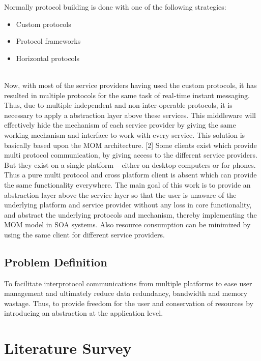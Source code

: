 \documentclass{SureshLimkar}
\begin{document}
Normally protocol building is done with one of the following strategies:
\begin{itemize}
\item Custom protocols
\item Protocol frameworks 
\item Horizontal protocols
\end{itemize}
\\
\hspace{0.5 in}Now, with most of the service providers having used the custom protocols, it has resulted in multiple protocols for the same task of real-time instant messaging. Thus, due to multiple independent and non-inter-operable protocols, it is necessary to apply a abstraction layer above these services. This middleware will effectively hide the mechanism of each service provider by giving the same working mechanism and interface to work with every service. This solution is basically based upon the MOM architecture. [2] Some clients exist which provide multi protocol communication, by giving access to the different service providers. But they exist on a single platform – either on desktop computers or for phones. Thus a pure multi protocol and cross platform client is absent which can provide the same functionality everywhere. The main goal of this work is to provide an abstraction layer above the service layer so that the user is unaware of the underlying platform and service provider without any loss in core functionality, and abstract the underlying protocols and mechanism, thereby implementing the MOM model in SOA systems. Also resource consumption can be minimized by using the same client for different service providers.
\\
\section{Problem Definition}
\hspace{0.5 in}To facilitate inter­protocol communications from multiple platforms to ease user management and ultimately reduce data redundancy, bandwidth and memory wastage. Thus, to provide freedom for the user and conservation of resources by introducing an abstraction at the application level. 

\chapter{Literature Survey}
\end{document}
